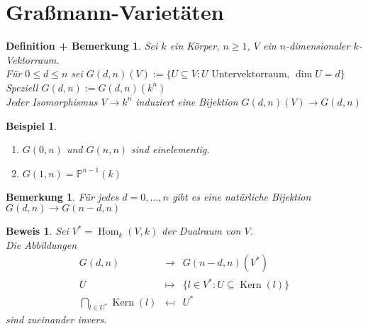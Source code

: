 \documentclass[a4paper,12pt]{report}
\theoremstyle{break}
\newtheorem{DefBem}[Def]{Definition + Bemerkung}
\newtheorem{Bem}[Def]{Bemerkung}
\theoremstyle{nonumberbreak}
\newtheorem{nnBsp}{Beispiel}
\newtheorem{Bew}{Beweis}
\theoremstyle{nonumberplain}
\newcommand{\quot}[1]{\textrm{\glqq}{#1}\textrm{\grqq}}
\DeclareMathOperator{\Hom}{Hom}
\DeclareMathOperator{\Kern}{Kern}
\newcommand{\IP}{\mathbb{P}}%
\begin{document}
\section{Gra\ss mann-Variet\"aten}

\begin{DefBem}
Sei $k$ ein K\"orper, $n\ge1$, $V$ ein $n$-dimensionaler $k$-Vektorraum.\\
F\"ur $0\le d\le n$ sei $G(d,n)(V):=\{U\subseteq V:U \text{ Untervektorraum, } \dim U=d\}$\\
Speziell $G(d,n):=G(d,n)(k^n)$\\
Jeder Isomorphismus $V\to k^n$ induziert eine Bijektion $G(d,n)(V)\to G(d,n)$
\end{DefBem}

\begin{nnBsp}\begin{enumerate}[1)]
\item
	$G(0,n)$ und $G(n,n)$ sind einelementig.
\item
	$G(1,n)=\IP^{n-1}(k)$
\end{enumerate}\end{nnBsp}

\begin{Bem}
F\"ur jedes $d=0,\ldots ,n$ gibt es eine \quot{nat\"urliche} Bijektion $G(d,n)\to G(n-d,n)$
\end{Bem}

\begin{Bew}
Sei $V^*=\Hom_k(V,k)$ der Dualraum von $V$.\\
Die Abbildungen
	\[\begin{array}{rcl}
		G(d,n) &\to& G(n-d,n)(V^*)\\
		U &\mapsto& \{l\in V^* :U\subseteq \Kern(l)\}\\
		\bigcap\limits_{l\in U^*}\Kern(l) &\mapsfrom& U^*
	\end{array}\]
sind zueinander invers.
\end{Bew}
\end{document}

